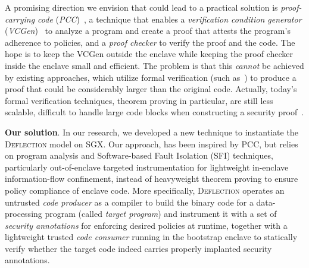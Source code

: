 

A promising direction we envision that could lead to a practical solution is \textit{proof-carrying code} (\textit{PCC})~\cite{necula1997proof,schneider2001language}, a technique that enables a \textit{verification condition generator} (\textit{VCGen})~\cite{colby2000certifying,leroy2006formal,pirzadeh2010extended} to analyze a program and create a proof that attests the program's adherence to policies, and a \textit{proof checker} to verify the proof and the code. The hope is to keep the VCGen outside the enclave while keeping the proof checker inside the enclave small and efficient.  The problem is that this \textit{cannot} be achieved by existing approaches, which utilize formal verification (such as~\cite{necula2001oracle,pirzadeh2010extended}) to produce a proof that could be considerably larger than the original code. Actually, today's formal verification techniques, theorem proving in particular, are still less scalable, difficult to handle large code blocks when constructing a security proof~\cite{sinha2015moat}. 


\vspace{3pt}\noindent\textbf{Our solution}. In our research, we developed a new technique to instantiate the \textsc{Deflection} model on SGX. Our approach, has been inspired by PCC, but relies on program analysis and Software-based Fault Isolation (SFI) techniques, particularly out-of-enclave targeted instrumentation for lightweight in-enclave information-flow confinement, instead of heavyweight theorem proving to ensure policy compliance of enclave code. More specifically, \textsc{Deflection} operates an untrusted \textit{code producer} as a compiler to build the binary code for a data-processing program (called \textit{target program}) and instrument it with a set of \textit{security annotations} for enforcing desired policies at runtime, together with a lightweight trusted \textit{code consumer} running in the bootstrap enclave to statically verify whether the target code indeed carries properly implanted security annotations.


